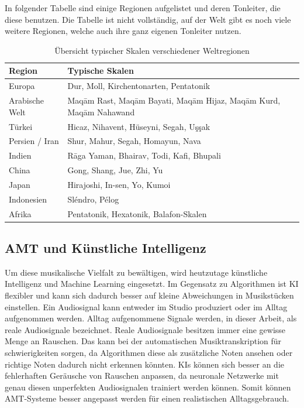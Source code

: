 In folgender Tabelle sind einige Regionen aufgelistet und deren Tonleiter, die diese benutzen.
Die Tabelle ist nicht vollständig, auf der Welt gibt es noch viele weitere Regionen, welche auch ihre ganz eigenen Tonleiter nutzen.
\begin{table}[H]
\centering
\begin{tabular}{|l|p{10cm}|}
\hline
\textbf{Region} & \textbf{Typische Skalen} \\ \hline
Europa & Dur, Moll, Kirchentonarten, Pentatonik \\
\hline
Arabische Welt & Maqām Rast, Maqām Bayati, Maqām Hijaz, Maqām Kurd, Maqām Nahawand \\
\hline
Türkei & Hicaz, Nihavent, Hüseyni, Segah, Uşşak \\
\hline
Persien / Iran & Shur, Mahur, Segah, Homayun, Nava \\
\hline
Indien & Rāga Yaman, Bhairav, Todi, Kafi, Bhupali \\
\hline
China & Gong, Shang, Jue, Zhi, Yu \\
\hline
Japan & Hirajoshi, In-sen, Yo, Kumoi \\
\hline
Indonesien & Sléndro, Pélog \\
\hline
Afrika & Pentatonik, Hexatonik, Balafon-Skalen \\
\hline
\end{tabular}
\caption{Übersicht typischer Skalen verschiedener Weltregionen}
\end{table}

\subsection{AMT und Künstliche Intelligenz}
Um diese musikalische Vielfalt zu bewältigen, wird heutzutage künstliche Intelligenz und Machine Learning eingesetzt.
Im Gegensatz zu Algorithmen ist KI flexibler und kann sich dadurch besser
auf kleine Abweichungen in Musikstücken einstellen.
Ein Audiosignal kann entweder im Studio produziert oder im Alltag aufgenommen werden.
Alltag aufgenommene Signale werden, in dieser Arbeit, als reale Audiosignale bezeichnet.
Reale Audiosignale besitzen immer eine gewisse Menge an Rauschen.
Das kann bei der automatischen Musiktranskription für schwierigkeiten sorgen,
da Algorithmen diese als zusätzliche Noten ansehen oder richtige Noten dadurch nicht erkennen könnten.
KIs können sich besser an die fehlerhaften Geräusche von Rauschen anpassen,
da neuronale Netzwerke mit genau diesen unperfekten Audiosignalen trainiert werden können.
Somit können AMT-Systeme besser angepasst werden für einen realistischen Alltagsgebrauch.

